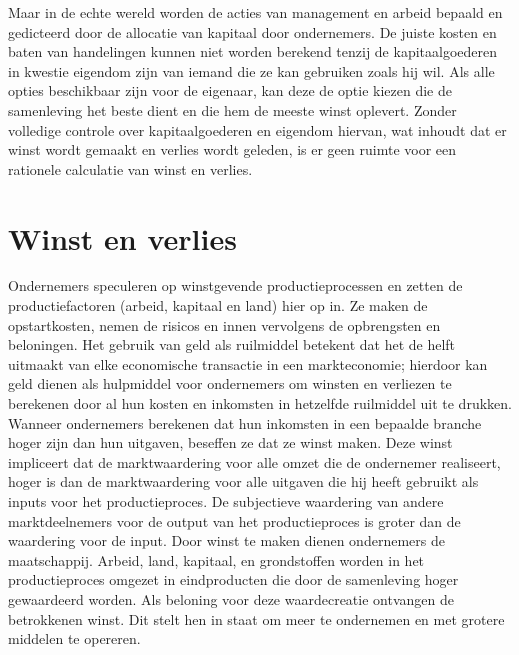Maar in de echte wereld worden de acties van management en arbeid bepaald en gedicteerd door de allocatie van kapitaal door ondernemers. De juiste kosten en baten van handelingen kunnen niet worden berekend tenzij de kapitaalgoederen in kwestie eigendom zijn van iemand die ze kan gebruiken zoals hij wil. Als alle opties beschikbaar zijn voor de eigenaar, kan deze de optie kiezen die de samenleving het beste dient en die hem de meeste winst oplevert. Zonder volledige controle over kapitaalgoederen en eigendom hiervan, wat inhoudt dat er winst wordt gemaakt en verlies wordt geleden, is er geen ruimte voor een rationele calculatie van winst en verlies.

\hypertarget{winst-en-verlies}{%
\section{Winst en verlies}\label{winst-en-verlies}}

Ondernemers speculeren op winstgevende productieprocessen en zetten de productiefactoren (arbeid, kapitaal en land) hier op in. Ze maken de opstartkosten, nemen de risico\textquotesingle s en innen vervolgens de opbrengsten en beloningen. Het gebruik van geld als ruilmiddel betekent dat het de helft uitmaakt van elke economische transactie in een markteconomie; hierdoor kan geld dienen als hulpmiddel voor ondernemers om winsten en verliezen te berekenen door al hun kosten en inkomsten in hetzelfde ruilmiddel uit te drukken. Wanneer ondernemers berekenen dat hun inkomsten in een bepaalde branche hoger zijn dan hun uitgaven, beseffen ze dat ze winst maken. Deze winst impliceert dat de marktwaardering voor alle omzet die de ondernemer realiseert, hoger is dan de marktwaardering voor alle uitgaven die hij heeft gebruikt als inputs voor het productieproces. De subjectieve waardering van andere marktdeelnemers voor de output van het productieproces is groter dan de waardering voor de input. Door winst te maken dienen ondernemers de maatschappij. Arbeid, land, kapitaal, en grondstoffen worden in het productieproces omgezet in eindproducten die door de samenleving hoger gewaardeerd worden. Als beloning voor deze waardecreatie ontvangen de betrokkenen winst. Dit stelt hen in staat om meer te ondernemen en met grotere middelen te opereren.

